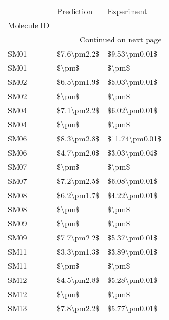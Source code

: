 \begin{longtable}{lll}
\toprule
{} &   Prediction &      Experiment \\
Molecule ID &              &                 \\
\midrule
\endhead
\midrule
\multicolumn{3}{r}{{Continued on next page}} \\
\midrule
\endfoot

\bottomrule
\endlastfoot
SM01        &  \$7.6\textbackslash pm2.2\$ &   \$9.53\textbackslash pm0.01\$ \\
SM01        &        \$\textbackslash pm\$ &           \$\textbackslash pm\$ \\
SM02        &  \$6.5\textbackslash pm1.9\$ &   \$5.03\textbackslash pm0.01\$ \\
SM02        &        \$\textbackslash pm\$ &           \$\textbackslash pm\$ \\
SM04        &  \$7.1\textbackslash pm2.2\$ &   \$6.02\textbackslash pm0.01\$ \\
SM04        &        \$\textbackslash pm\$ &           \$\textbackslash pm\$ \\
SM06        &  \$8.3\textbackslash pm2.8\$ &  \$11.74\textbackslash pm0.01\$ \\
SM06        &  \$4.7\textbackslash pm2.0\$ &   \$3.03\textbackslash pm0.04\$ \\
SM07        &        \$\textbackslash pm\$ &           \$\textbackslash pm\$ \\
SM07        &  \$7.2\textbackslash pm2.5\$ &   \$6.08\textbackslash pm0.01\$ \\
SM08        &  \$6.2\textbackslash pm1.7\$ &   \$4.22\textbackslash pm0.01\$ \\
SM08        &        \$\textbackslash pm\$ &           \$\textbackslash pm\$ \\
SM09        &        \$\textbackslash pm\$ &           \$\textbackslash pm\$ \\
SM09        &  \$7.7\textbackslash pm2.2\$ &   \$5.37\textbackslash pm0.01\$ \\
SM11        &  \$3.3\textbackslash pm1.3\$ &   \$3.89\textbackslash pm0.01\$ \\
SM11        &        \$\textbackslash pm\$ &           \$\textbackslash pm\$ \\
SM12        &  \$4.5\textbackslash pm2.8\$ &   \$5.28\textbackslash pm0.01\$ \\
SM12        &        \$\textbackslash pm\$ &           \$\textbackslash pm\$ \\
SM13        &  \$7.8\textbackslash pm2.2\$ &   \$5.77\textbackslash pm0.01\$ \\

\end{longtable}

